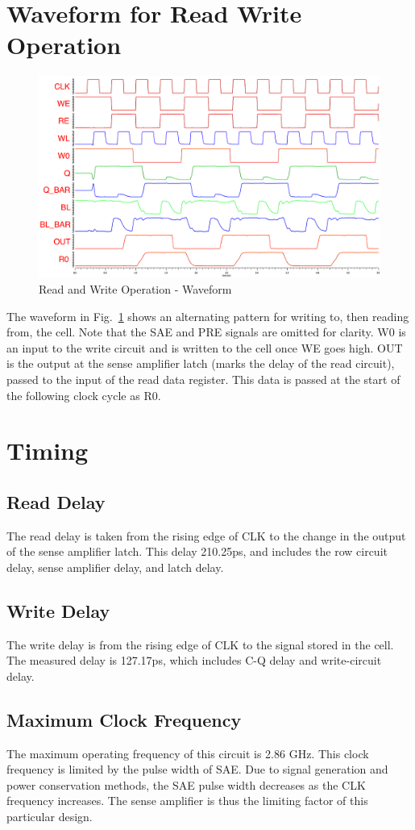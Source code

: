 \documentclass[conference]{IEEEtran}
\begin{document}
\section{Waveform for Read Write Operation}
\begin{figure}[h!]
\centering
\includegraphics[clip,width=\columnwidth]{Read-Write-16x4.png}
\caption{Read and Write Operation - Waveform}
\label{fig:read-write}
\end{figure}
The waveform in Fig.~\ref{fig:read-write} shows an alternating pattern for writing to, then reading from, the cell. Note that the SAE and PRE signals are omitted for clarity. W0 is an input to the write circuit and is written to the cell once WE goes high. OUT is the output at the sense amplifier latch (marks the delay of the read circuit), passed to the input of the read data register. This data is passed at the start of the following clock cycle as R0.
\section{Timing}
\subsection{Read Delay}
The read delay is taken from the rising edge of CLK to the change in the output of the sense amplifier latch. This delay 210.25ps, and includes the row circuit delay, sense amplifier delay, and latch delay.
\subsection{Write Delay}
The write delay is from the rising edge of CLK to the signal stored in the cell. The measured delay is 127.17ps, which includes C-Q delay and write-circuit delay.
\subsection{Maximum Clock Frequency}
The maximum operating frequency of this circuit is 2.86 GHz. This clock frequency is limited by the pulse width of SAE. Due to signal generation and power conservation methods, the SAE pulse width decreases as the CLK frequency increases. The sense amplifier is thus the limiting factor of this particular design.
\end{document}
